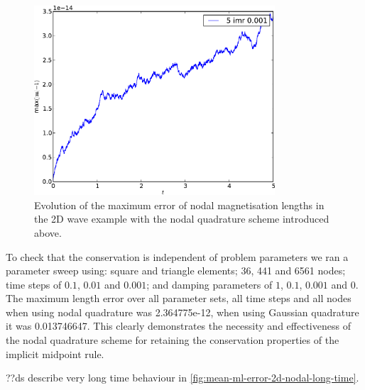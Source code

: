 \begin{figure}[ht!]
  \centering
  \includegraphics[width=0.8\textwidth]{plots/2d_wave_solution_m_length/lnodal-maxmathbfm-1vst.pdf}
  \caption{Evolution of the maximum error of nodal magnetisation lengths in the 2D wave example with the nodal quadrature scheme introduced above.}
  \label{fig:mean-ml-error-2d-nodal}
\end{figure}

To check that the conservation is independent of problem parameters we ran a parameter sweep using: square and triangle elements; 36, 441 and 6561 nodes; time steps of $0.1$, $0.01$ and $0.001$; and damping parameters of $1$, $0.1$, $0.001$ and $0$.
The maximum length error over all parameter sets, all time steps and all nodes when using nodal quadrature was 2.364775e-12, when using Gaussian quadrature it was 0.013746647.
This clearly demonstrates the necessity and effectiveness of the nodal quadrature scheme for retaining the conservation properties of the implicit midpoint rule.


??ds describe very long time behaviour in \autoref{fig:mean-ml-error-2d-nodal-long-time}.


